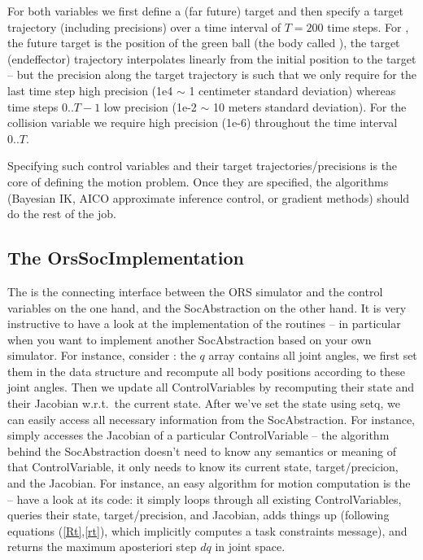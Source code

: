 For both variables we first define a (far future) target 
and then specify a target trajectory (including precisions) over a
time interval of $T=200$ time steps. For , the future target is
the position of the green ball (the body called ), the
target (endeffector) trajectory interpolates linearly from the initial
position to the target -- but the precision along the target
trajectory is such that we only require for the last time step high
precision (1e4 $\sim$ 1 centimeter standard deviation) whereas time
steps $0..T-1$ low precision (1e-2 $\sim$ 10 meters standard
deviation). For the collision variable we require high precision (1e-6)
throughout the time interval $0..T$.

Specifying such control variables and their target
trajectories/precisions is the core of defining the motion
problem. Once they are specified, the algorithms (Bayesian IK, AICO
approximate inference control, or gradient methods) should do the rest
of the job.

\subsection{The OrsSocImplementation}

The  is the connecting interface between
the ORS simulator and the control variables on the one hand, and the
SocAbstraction on the other hand. It is very instructive to have a
look at the implementation of the routines -- in particular when you
want to implement another SocAbstraction based on your own
simulator. For instance, consider :
the $q$ array contains all joint angles, we first set them in the
 data structure and recompute all body positions according
to these joint angles. Then we update all ControlVariables by
recomputing their state and their Jacobian w.r.t.\ the current
state. After we've set the state using setq, we can easily access all
necessary information from the SocAbstraction. For instance,
 simply accesses the Jacobian of a
particular ControlVariable -- the algorithm behind the SocAbstraction
doesn't need to know any semantics or meaning of that ControlVariable,
it only needs to know its current state, target/precicion, and the
Jacobian. For instance, an easy algorithm for motion computation is
the  -- have a look at its code: it
simply loops through all existing ControlVariables, queries their
state, target/precision, and Jacobian, adds things up (following
equations (\ref{Rt},\ref{rt}), which implicitly computes a task
constraints message), and returns the maximum aposteriori step $dq$ in
joint space.


